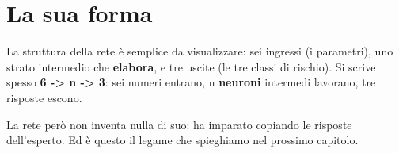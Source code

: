 \section{La sua forma}\label{sec:p1-rete-forma}

La struttura della rete è semplice da visualizzare: sei ingressi (i parametri),
uno strato intermedio che \textbf{elabora}, e tre uscite (le tre classi di
rischio). Si scrive spesso \textbf{6 -> n -> 3}: sei numeri entrano, n
\textbf{neuroni} intermedi lavorano, tre risposte escono.

La rete però non inventa nulla di suo: ha imparato copiando le risposte
dell'esperto. Ed è questo il legame che spieghiamo nel prossimo capitolo.
